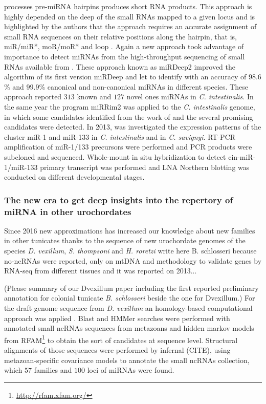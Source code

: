 \documentclass[graybox]{svmult}
\begin{document}
processes pre-miRNA hairpins produces short RNA products. This approach is 
highly depended on the deep of the small RNAs mapped to a given locus and is 
highlighted by the authors that the approach requires an accurate assignment of 
small RNA sequences on their relative positions along the hairpin, that is, 
miR/miR*, moR/moR* and loop \cite{Hendrix2010}. Again a new approach took 
advantage of importance to detect miRNAs from the high-throughput sequencing of 
small RNAs available from \cite{Shi2009}. These approach known as  miRDeep2 
improved the algorithm of its first version miRDeep \cite{Friedlaender:12} and 
let to identify with an accuracy of $98.6$\% and $99.9$\% canonical and 
non-canonical miRNAs in different species. These approach reported $313$ known 
and $127$ novel ones miRNAs in \textit{C. intestinalis}. In the same year the 
program miRRim2 \cite{Terai2012} was applied to the \textit{C. intestinalis} 
genome, in which some candidates identified from the work of \cite{Hendrix2010} 
and the several promising candidates were detected. In 2013, \cite{Kusakabe2013} 
was investigated the expression patterns of the cluster miR-1 and miR-133 in 
\textit{C. intestinalis} and in \textit{C. savignyi}. RT-PCR amplification of 
miR-1/133 precursors were performed and PCR products were subcloned and 
sequenced. Whole-mount in situ hybridization to detect cin-miR-1/miR-133 primary 
transcript was performed and LNA Northern blotting was conducted on different 
developmental stages. 

\subsubsection{The new era to get deep insights into the repertory of miRNA in other urochordates}

Since 2016 new approximations has increased our knowledge about new families in 
other tunicates thanks to the sequence of new urochordate genomes of the species 
\textit{D. vexillum}, \textit{S. thompsoni} and \textit{H. roretzi} %
write here B. schlosseri because no-ncRNAs were reported, only on mtDNA and 
methodology to validate genes by RNA-seq from different tissues and it was 
reported on 2013...

(Please summary of our Dvexillum paper \cite{Velandia-Huerto2016} including the 
first reported preliminary annotation for colonial tunicate \textit{B. 
schlosseri} beside the one for Dvexillum.)
For the draft genome sequence from \textit{D. vexillum} an 
homology-based computational approach was applied \cite{Velandia-Huerto2016}. 
Blast and HMMer searches were performed with annotated small ncRNAs sequences 
from metazoans and hidden markov models from 
RFAM\footnote{\url{http://rfam.xfam.org/}} to obtain the sort of candidates at 
sequence level. Structural alignments of those sequences were performed by 
infernal (CITE), using metazoan-specific covariance models to annotate the small 
ncRNAs collection, which $57$ families and $100$ loci of miRNAs were found. 
\end{document}
